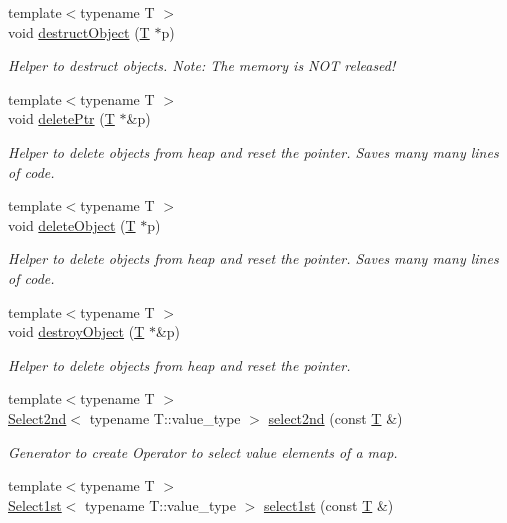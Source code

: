 \begin{DoxyCompactItemize}
{\footnotesize template$<$typename T $>$ }\\void \hyperlink{namespace_d_d4hep_a669c4e7f90457026257585c1deb62d1e}{destruct\+Object} (\hyperlink{class_t}{T} $\ast$p)
\begin{DoxyCompactList}\small\item\em Helper to destruct objects. Note\+: The memory is N\+OT released! \end{DoxyCompactList}\item 
{\footnotesize template$<$typename T $>$ }\\void \hyperlink{namespace_d_d4hep_a14ac1cc5b1c931da327a5b2ed57fdd85}{delete\+Ptr} (\hyperlink{class_t}{T} $\ast$\&p)
\begin{DoxyCompactList}\small\item\em Helper to delete objects from heap and reset the pointer. Saves many many lines of code. \end{DoxyCompactList}\item 
{\footnotesize template$<$typename T $>$ }\\void \hyperlink{namespace_d_d4hep_ab17a8692fe8e07072174088bb872a67d}{delete\+Object} (\hyperlink{class_t}{T} $\ast$p)
\begin{DoxyCompactList}\small\item\em Helper to delete objects from heap and reset the pointer. Saves many many lines of code. \end{DoxyCompactList}\item 
{\footnotesize template$<$typename T $>$ }\\void \hyperlink{namespace_d_d4hep_a810f6459a5e1e3e5e55f081862bb4d16}{destroy\+Object} (\hyperlink{class_t}{T} $\ast$\&p)
\begin{DoxyCompactList}\small\item\em Helper to delete objects from heap and reset the pointer. \end{DoxyCompactList}\item 
{\footnotesize template$<$typename T $>$ }\\\hyperlink{class_d_d4hep_1_1_select2nd}{Select2nd}$<$ typename T\+::value\+\_\+type $>$ \hyperlink{namespace_d_d4hep_a22c05bed3f5fb9b01958d687af1cad65}{select2nd} (const \hyperlink{class_t}{T} \&)
\begin{DoxyCompactList}\small\item\em Generator to create Operator to select value elements of a map. \end{DoxyCompactList}\item 
{\footnotesize template$<$typename T $>$ }\\\hyperlink{class_d_d4hep_1_1_select1st}{Select1st}$<$ typename T\+::value\+\_\+type $>$ \hyperlink{namespace_d_d4hep_a213624c480553b45f428618f77e27d2f}{select1st} (const \hyperlink{class_t}{T} \&)

\end{DoxyCompactItemize}
